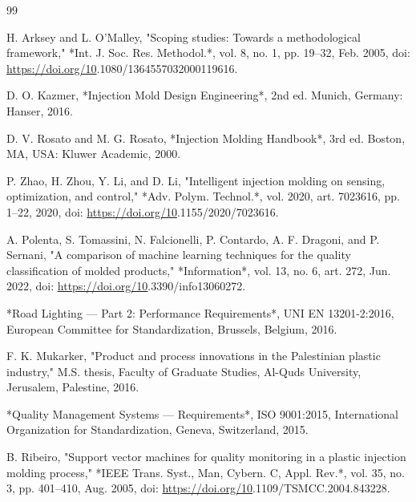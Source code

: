 %
\begin{thebibliography}{99}

 H. Arksey and L. O'Malley, "Scoping studies: Towards a methodological framework," *Int. J. Soc. Res. Methodol.*, vol. 8, no. 1, pp. 19–32, Feb. 2005, doi: \url{https://doi.org/10}.1080/1364557032000119616.

 D. O. Kazmer, *Injection Mold Design Engineering*, 2nd ed. Munich, Germany: Hanser, 2016.

 D. V. Rosato and M. G. Rosato, *Injection Molding Handbook*, 3rd ed. Boston, MA, USA: Kluwer Academic, 2000.

 P. Zhao, H. Zhou, Y. Li, and D. Li, "Intelligent injection molding on sensing, optimization, and control," *Adv. Polym. Technol.*, vol. 2020, art. 7023616, pp. 1–22, 2020, doi: \url{https://doi.org/10}.1155/2020/7023616.

 A. Polenta, S. Tomassini, N. Falcionelli, P. Contardo, A. F. Dragoni, and P. Sernani, "A comparison of machine learning techniques for the quality classification of molded products," *Information*, vol. 13, no. 6, art. 272, Jun. 2022, doi: \url{https://doi.org/10}.3390/info13060272.

 *Road Lighting — Part 2: Performance Requirements*, UNI EN 13201-2:2016, European Committee for Standardization, Brussels, Belgium, 2016.

 F. K. Mukarker, "Product and process innovations in the Palestinian plastic industry," M.S. thesis, Faculty of Graduate Studies, Al-Quds University, Jerusalem, Palestine, 2016.

 *Quality Management Systems — Requirements*, ISO 9001:2015, International Organization for Standardization, Geneva, Switzerland, 2015.

 B. Ribeiro, "Support vector machines for quality monitoring in a plastic injection molding process," *IEEE Trans. Syst., Man, Cybern. C, Appl. Rev.*, vol. 35, no. 3, pp. 401–410, Aug. 2005, doi: \url{https://doi.org/10}.1109/TSMCC.2004.843228.


\end{thebibliography}
